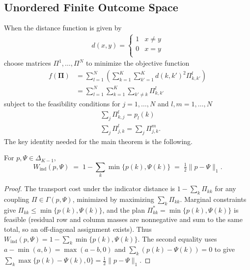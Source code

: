 \subsection{Unordered Finite Outcome Space}
\label{sec:unordered}
When the distance function is given by
\begin{align*}
d(x,y)= \left\{
\begin{array}{ll}
      1 & x\neq y \\
      0 & x=y \\
\end{array} 
\right.
\end{align*}
choose matrices $\Pi^1,\ldots,\Pi^N$ to minimize the objective function
\begin{align*}
f(\mathbf{\Pi})&=\sum_{l=1}^N\left(\sum_{k=1}^K\sum_{k'=1}^K d(k,k')^2\Pi^l_{k,k'}\right) \\
&=\sum_{l=1}^N\sum_{k=1}^K\sum_{k'\neq k}\Pi^l_{k,k'}
\end{align*}
subject to the feasibility conditions for $j=1,\ldots,N$ and $l,m=1,\ldots,N$
\begin{align*}
&\sum_j\Pi^l_{k,j}=p_l(k) \\
&\sum_j\Pi^l_{j,k}=\sum_j\Pi^m_{j,k}.
\end{align*}
The key identity needed for the main theorem is the following.

\begin{lemma}
\label{lem:ot_diagonal}
For $p, \Psi \in \Delta_{K-1}$,
\[
  W_{\mathrm{ind}}(p,\Psi) \;=\; 1 - \sum_k \min\{p(k),\Psi(k)\} \;=\; \tfrac{1}{2}\|p - \Psi\|_1.
\]
\end{lemma}
\begin{proof}
The transport cost under the indicator distance is $1 - \sum_k \Pi_{kk}$ for any coupling $\Pi \in \Gamma(p,\Psi)$, minimized by maximizing $\sum_k \Pi_{kk}$.  Marginal constraints give $\Pi_{kk} \leq \min\{p(k),\Psi(k)\}$, and the plan $\Pi^*_{kk} = \min\{p(k),\Psi(k)\}$ is feasible (residual row and column masses are nonneg\-ative and sum to the same total, so an off-diagonal assignment exists).  Thus $W_{\mathrm{ind}}(p,\Psi) = 1 - \sum_k \min\{p(k),\Psi(k)\}$.  The second equality uses $a - \min(a,b) = \max(a-b,0)$ and $\sum_k(p(k)-\Psi(k)) = 0$ to give $\sum_k\max\{p(k)-\Psi(k),0\} = \tfrac{1}{2}\|p-\Psi\|_1$.
\end{proof}

